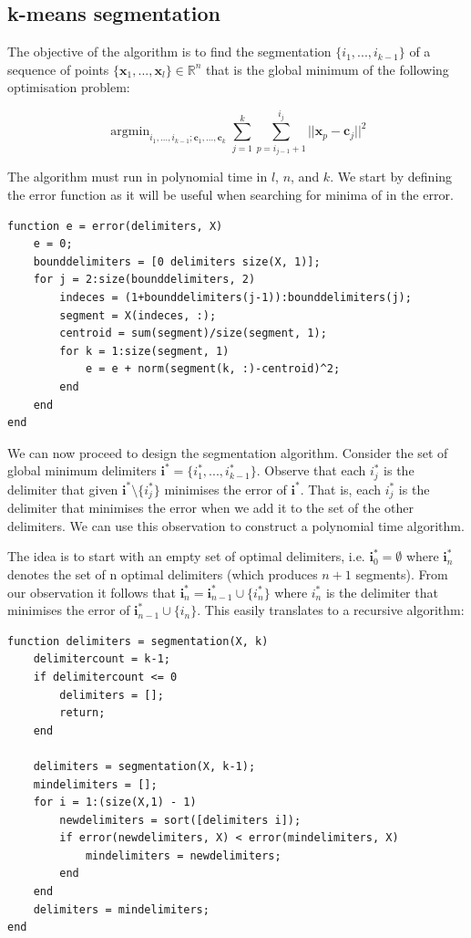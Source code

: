 \documentclass[11pt]{article}
\DeclareMathOperator*{\argmin}{argmin}
\begin{document}
\subsection{k-means segmentation}

    The objective of the algorithm is to find the segmentation $\{i_1, ..., i_{k-1}\}$ of a sequence of points $\{\mathbf{x}_1, ..., \mathbf{x}_l\} \in \mathbb{R}^n$ that is the global minimum of the following optimisation problem:
    
    \begin{equation}
        \argmin_{i_1, ..., i_{k-1}; \mathbf{c}_1, ..., \mathbf{c}_k} \sum_{j=1}^k \sum_{p=i_{j-1} + 1}^{i_j} ||\mathbf{x}_p - \mathbf{c}_j ||^2
    \end{equation}
    
    The algorithm must run in polynomial time in $l$, $n$, and $k$. We start by defining the error function as it will be useful when searching for minima of in the error.
    
    \begin{lstlisting}
function e = error(delimiters, X)
    e = 0;
    bounddelimiters = [0 delimiters size(X, 1)];
    for j = 2:size(bounddelimiters, 2)
        indeces = (1+bounddelimiters(j-1)):bounddelimiters(j);
        segment = X(indeces, :);
        centroid = sum(segment)/size(segment, 1);
        for k = 1:size(segment, 1)
            e = e + norm(segment(k, :)-centroid)^2;
        end
    end
end\end{lstlisting}
    
    We can now proceed to design the segmentation algorithm. Consider the set of global minimum delimiters $\mathbf{i}^* = \{i^*_1, ..., i^*_{k-1}\}$. Observe that each $i^*_j$ is the delimiter that given $\mathbf{i}^* \setminus \{i^*_j \}$ minimises the error of $\mathbf{i}^*$. That is, each $i^*_j$ is the delimiter that minimises the error when we add it to the set of the other delimiters. We can use this observation to construct a polynomial time algorithm. 
    \par The idea is to start with an empty set of optimal delimiters, i.e. $\mathbf{i}^*_0 = \emptyset$ where $\mathbf{i}^*_n$ denotes the set of n optimal delimiters (which produces $n+1$ segments). From our observation it follows that $\mathbf{i}^*_n = \mathbf{i}^*_{n-1} \cup \{ i^*_n \}$ where $i^*_n$ is the delimiter that minimises the error of $\mathbf{i}^*_{n-1} \cup \{ i_n \}$. This easily translates to a recursive algorithm:
    
    \begin{lstlisting}
function delimiters = segmentation(X, k)
    delimitercount = k-1;
    if delimitercount <= 0
        delimiters = [];
        return;
    end
    
    delimiters = segmentation(X, k-1);
    mindelimiters = [];
    for i = 1:(size(X,1) - 1)
        newdelimiters = sort([delimiters i]);
        if error(newdelimiters, X) < error(mindelimiters, X)
            mindelimiters = newdelimiters;
        end
    end
    delimiters = mindelimiters;
end\end{lstlisting}
\end{document}
